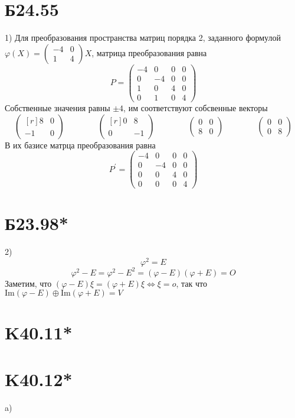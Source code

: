 \documentclass[a4paper,12pt]{article} %
\begin{document}
\section*{Б24.55}1) Для преобразования пространства матриц порядка 2, заданного формулой $\varphi(X)=\begin{pmatrix*}
    -4&0\\
    1&4
\end{pmatrix*}X$, матрица преобразования равна
$$P=\begin{pmatrix*}
    -4&0&0&0\\
    0&-4&0&0\\
    1&0&4&0\\
    0&1&0&4
\end{pmatrix*}$$
Собственные значения равны $\pm4$, им соответствуют собсвенные векторы
$$\begin{pmatrix*}[r]
    8&0\\
    -1&0
\end{pmatrix*}\quad\quad\quad\quad\begin{pmatrix*}[r]
    0&8\\
    0&-1
\end{pmatrix*}\quad\quad\quad\quad\begin{pmatrix*}
    0&0\\
    8&0
\end{pmatrix*}\quad\quad\quad\quad\begin{pmatrix*}
    0&0\\
    0&8
\end{pmatrix*}$$
В их базисе матрца преобразования равна
$$P^{\prime}=\begin{pmatrix*}
    -4&0&0&0\\
    0&-4&0&0\\
    0&0&4&0\\
    0&0&0&4
\end{pmatrix*}$$
\section*{Б23.98*}2)$$\varphi^2=E$$
$$\varphi^2-E=\varphi^2-E^2=(\varphi-E)(\varphi+E)=O$$
Заметим, что $(\varphi-E)\xi=(\varphi+E)\xi\Leftrightarrow\xi=o$, так что $\mathrm{Im}(\varphi-E)\oplus\mathrm{Im}(\varphi+E)=V$
\section*{K40.11*}
\section*{K40.12*}a)
\end{document}
